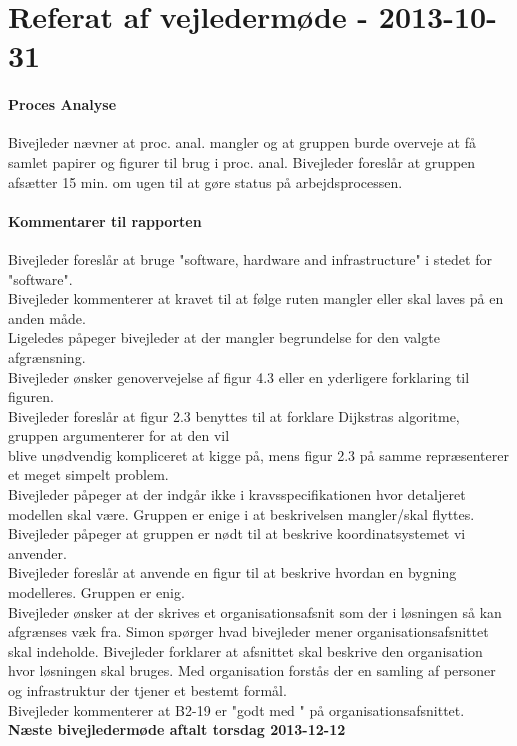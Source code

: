 \documentclass[article,11pt]{memoir}
\begin{document}
\section{Referat af vejledermøde - 2013-10-31}
\paragraph{Proces Analyse}
Bivejleder nævner at proc. anal. mangler og at gruppen burde overveje at få samlet papirer og figurer til brug i proc. anal. Bivejleder foreslår at gruppen afsætter 15 min. om ugen til at gøre status på arbejdsprocessen.
\paragraph{Kommentarer til rapporten}
Bivejleder foreslår at bruge "software, hardware and infrastructure" i stedet for "software".\\
Bivejleder kommenterer at kravet til at følge ruten mangler eller skal laves på en anden måde.\\
Ligeledes påpeger bivejleder at der mangler begrundelse for den valgte afgrænsning.\\
Bivejleder ønsker genovervejelse af figur 4.3 eller en yderligere forklaring til figuren.\\
Bivejleder foreslår at figur 2.3 benyttes til at forklare Dijkstras algoritme, gruppen argumenterer for at den vil \\blive unødvendig kompliceret at kigge på, mens figur 2.3 på samme repræsenterer et meget simpelt problem.\\
Bivejleder påpeger at der indgår ikke i kravsspecifikationen hvor detaljeret modellen skal være. Gruppen er enige i at beskrivelsen mangler/skal flyttes.\\
Bivejleder påpeger at gruppen er nødt til at beskrive koordinatsystemet vi anvender.\\
Bivejleder foreslår at anvende en figur til at beskrive hvordan en bygning modelleres. Gruppen er enig.\\
Bivejleder ønsker at der skrives et organisationsafsnit som der i løsningen så kan afgrænses væk fra.
Simon spørger hvad bivejleder mener organisationsafsnittet skal indeholde.
Bivejleder forklarer at afsnittet skal beskrive den organisation hvor løsningen skal bruges. Med organisation forstås der en samling af personer og infrastruktur der tjener et bestemt formål.\\
Bivejleder kommenterer at B2-19 er "godt med " på organisationsafsnittet.\\
\textbf{Næste bivejledermøde aftalt torsdag 2013-12-12} 
\end{document}
